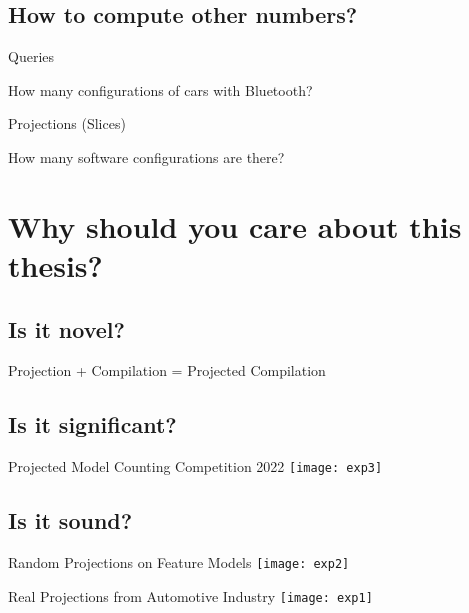\documentclass[
	aspectratio=169, %
	8pt, %
]{beamer}
\begin{document}
\subsection{How to compute other numbers?}
\begin{frame}{\insertsubsection\hfill{}Queries}
	\begin{fancycolumns}
		\centering{}
		\nextcolumn
		How many configurations of cars with Bluetooth?
	\end{fancycolumns}
\end{frame}
\begin{frame}{\insertsubsection\hfill{}Projections (Slices)}
	\begin{fancycolumns}
		\centering\pic[height=70mm,trim={0\width} {.1\height} {.42\width} {.1\height},clip,page=5]{pD4}
		\nextcolumn
		How many software configurations are there?
	\end{fancycolumns}
\end{frame}

\section{Why should you care about this thesis?}

\subsection{Is it novel?}
\begin{frame}{\insertsubsection\hfill{}Projection + Compilation = Projected Compilation}
\end{frame}

\subsection{Is it significant?}
\begin{frame}{\insertsubsection\hfill{}Projected Model Counting Competition 2022}
	\texttt{[image: exp3]}
\end{frame}

\subsection{Is it sound?}
\begin{frame}{\insertsubsection\hfill{}Random Projections on Feature Models}
	\centering\texttt{[image: exp2]}
\end{frame}
\begin{frame}{\insertsubsection\hfill{}Real Projections from Automotive Industry}
	\centering\texttt{[image: exp1]}
\end{frame}
\end{document}
